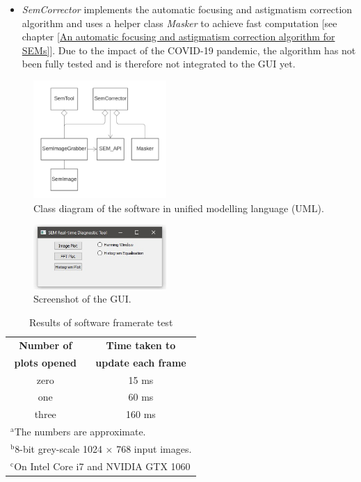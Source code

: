 \documentclass[12pt, twocolumn]{report}
\begin{document}
\begin{itemize}
    \item \textit{SemCorrector} implements the automatic focusing and astigmatism correction algorithm and uses a helper class \textit{Masker} to achieve fast computation [see chapter \ref{An automatic focusing and astigmatism correction algorithm for SEMs}]. Due to the impact of the COVID-19 pandemic, the algorithm has not been fully tested and is therefore not integrated to the GUI yet.
\end{itemize}

\begin{figure}[htbp]
    \centering
    \includegraphics[width=0.45\textwidth]{Figures/Software class diagram.png}
    \caption{Class diagram of the software in unified modelling language (UML).}
    \label{Software class diagram}
\end{figure}

\begin{figure}[htbp]
    \centering
    \includegraphics[width=0.45\textwidth]{Figures/Software screenshot.jpg}
    \caption{Screenshot of the GUI.}
    \label{Software GUI}
\end{figure}

\begin{table}[htbp]
    \caption{Results of software framerate test}
    \begin{center}
    \begin{tabular}{|c|c|}
    \hline
    \textbf{Number of} & \textbf{Time taken to} \\
    \textbf{plots opened} & \textbf{update each frame} \\
    \hline
    zero & 15 ms \\
    \hline
    one & 60 ms \\
    \hline
    three & 160 ms \\
    \hline
    \multicolumn{2}{l}{$^{\mathrm{a}}$The numbers are approximate.} \\
    \multicolumn{2}{l}{$^{\mathrm{b}}$8-bit grey-scale 1024 $\times$ 768 input images.} \\
    \multicolumn{2}{l}{$^{\mathrm{c}}$On Intel Core i7 and NVIDIA GTX 1060 }
    \end{tabular}
    \label{Test software framerates}
    \end{center}
\end{table}
\end{document}
